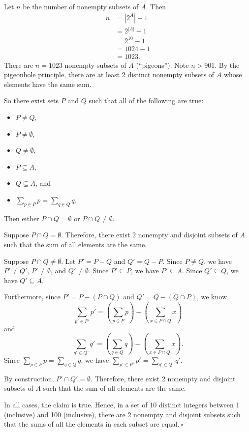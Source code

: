 \documentclass{article}
\theoremstyle{definition}
\begin{document}
\begin{solution}
\begin{enumerate}
Let $n$ be the number of nonempty subsets of $A$. Then
\begin{align*}
n
&=\left|2^A\right|-1\\
&=2^{|A|}-1\\
&=2^{10}-1\\
&=1024-1\\
&=1023.
\end{align*}
There are $n=1023$ nonempty subsets of $A$ (``pigeons''). Note $n>901$. By the pigeonhole principle, there are at least 2 distinct nonempty subsets of $A$ whose elements have the same sum.

So there exist sets $P$ and $Q$ such that all of the following are true:
\begin{itemize}
    \item$P\neq Q$,
    \item$P\neq\emptyset$,
    \item$Q\neq\emptyset$,
    \item$P\subseteq A$,
    \item$Q\subseteq A$, and
    \item$\sum_{p\in P}{p}=\sum_{q\in Q}{q}.$
\end{itemize}
Then either $P\cap Q=\emptyset$ or $P\cap Q\neq\emptyset$.

Suppose $P\cap Q=\emptyset$. Therefore, there exist 2 nonempty and disjoint subsets of $A$ such that the sum of all elements are the same.

Suppose $P\cap Q\neq\emptyset$. Let $P'=P-Q$ and $Q'=Q-P$. Since $P\neq Q$, we have $P'\neq Q'$, $P'\neq\emptyset$, and $Q'\neq\emptyset$. Since $P'\subseteq P$, we have $P'\subseteq A$. Since $Q'\subseteq Q$, we have $Q'\subseteq A$.

Furthermore, since $P'=P-(P\cap Q)$ and $Q'=Q-(Q\cap P)$, we know \[\sum_{p'\in P'}{p'}=\left(\sum_{p\in P}{p}\right)-\left(\sum_{x\in P\cap Q}{x}\right)\] and \[\sum_{q'\in Q'}{q'}=\left(\sum_{q\in Q}{q}\right)-\left(\sum_{x\in P\cap Q}{x}\right).\] Since $\sum_{p\in P}{p}=\sum_{q\in Q}{q}$, we have $\sum_{p'\in P'}{p'}=\sum_{q'\in Q'}{q'}$.

By construction, $P'\cap Q'=\emptyset$. Therefore, there exist 2 nonempty and disjoint subsets of $A$ such that the sum of all elements are the same.

In all cases, the claim is true. Hence, in a set of 10 distinct integers between 1 (inclusive) and 100 (inclusive), there are 2 nonempty and disjoint subsets such that the sums of all the elements in each subset are equal.$~\square$
\end{enumerate}
\end{solution}
\end{document}

